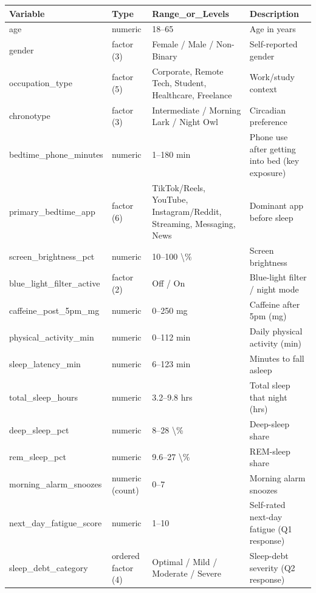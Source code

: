 
\begin{tabular}{llll}
\toprule
Variable & Type & Range\_or\_Levels & Description\\
\midrule
age & numeric & 18--65 & Age in years\\
gender & factor (3) & Female / Male / Non-Binary & Self-reported gender\\
occupation\_type & factor (5) & Corporate, Remote Tech, Student, Healthcare, Freelance & Work/study context\\
chronotype & factor (3) & Intermediate / Morning Lark / Night Owl & Circadian preference\\
bedtime\_phone\_minutes & numeric & 1--180 min & Phone use after getting into bed (key exposure)\\
primary\_bedtime\_app & factor (6) & TikTok/Reels, YouTube, Instagram/Reddit, Streaming, Messaging, News & Dominant app before sleep\\
screen\_brightness\_pct & numeric & 10--100 \textbackslash{}\% & Screen brightness\\
blue\_light\_filter\_active & factor (2) & Off / On & Blue-light filter / night mode\\
caffeine\_post\_5pm\_mg & numeric & 0--250 mg & Caffeine after 5pm (mg)\\
physical\_activity\_min & numeric & 0--112 min & Daily physical activity (min)\\
sleep\_latency\_min & numeric & 6--123 min & Minutes to fall asleep\\
total\_sleep\_hours & numeric & 3.2--9.8 hrs & Total sleep that night (hrs)\\
deep\_sleep\_pct & numeric & 8--28 \textbackslash{}\% & Deep-sleep share\\
rem\_sleep\_pct & numeric & 9.6--27 \textbackslash{}\% & REM-sleep share\\
morning\_alarm\_snoozes & numeric (count) & 0--7 & Morning alarm snoozes\\
next\_day\_fatigue\_score & numeric & 1--10 & Self-rated next-day fatigue (Q1 response)\\
sleep\_debt\_category & ordered factor (4) & Optimal / Mild / Moderate / Severe & Sleep-debt severity (Q2 response)\\
\bottomrule
\end{tabular}
